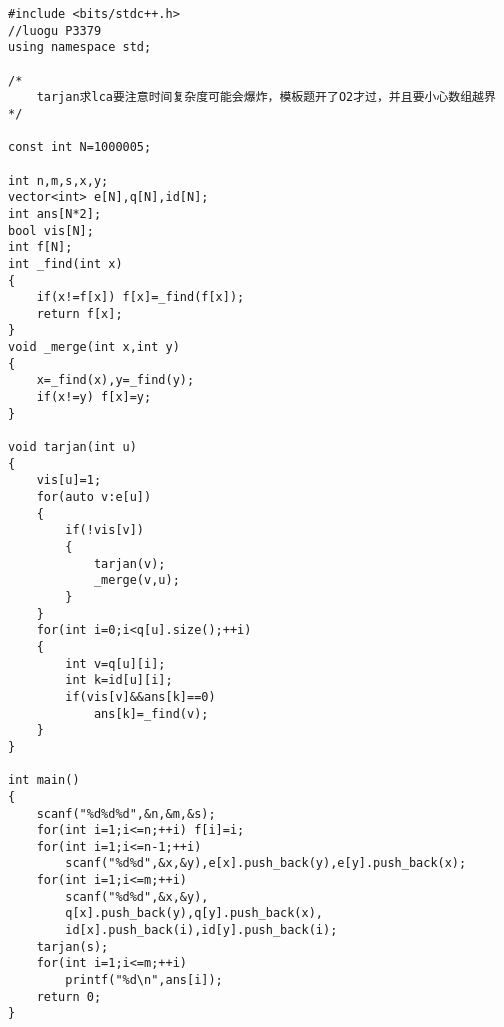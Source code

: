 \begin{lstlisting}
#include <bits/stdc++.h>
//luogu P3379
using namespace std;

/*
	tarjan求lca要注意时间复杂度可能会爆炸，模板题开了O2才过，并且要小心数组越界
*/

const int N=1000005;

int n,m,s,x,y;
vector<int> e[N],q[N],id[N];
int ans[N*2];
bool vis[N];
int f[N];
int _find(int x)
{
	if(x!=f[x]) f[x]=_find(f[x]);
	return f[x];
}
void _merge(int x,int y)
{
	x=_find(x),y=_find(y);
	if(x!=y) f[x]=y;
}

void tarjan(int u)
{
	vis[u]=1;
	for(auto v:e[u])
	{
		if(!vis[v])
		{
			tarjan(v);
			_merge(v,u);
		}
	}
	for(int i=0;i<q[u].size();++i)
	{
		int v=q[u][i];
		int k=id[u][i];
		if(vis[v]&&ans[k]==0)
			ans[k]=_find(v);
	}
}

int main()
{
	scanf("%d%d%d",&n,&m,&s);
	for(int i=1;i<=n;++i) f[i]=i;
	for(int i=1;i<=n-1;++i)
		scanf("%d%d",&x,&y),e[x].push_back(y),e[y].push_back(x);
	for(int i=1;i<=m;++i)
		scanf("%d%d",&x,&y),
		q[x].push_back(y),q[y].push_back(x),
		id[x].push_back(i),id[y].push_back(i);
	tarjan(s);
	for(int i=1;i<=m;++i)
		printf("%d\n",ans[i]);
	return 0;
}
\end{lstlisting}
